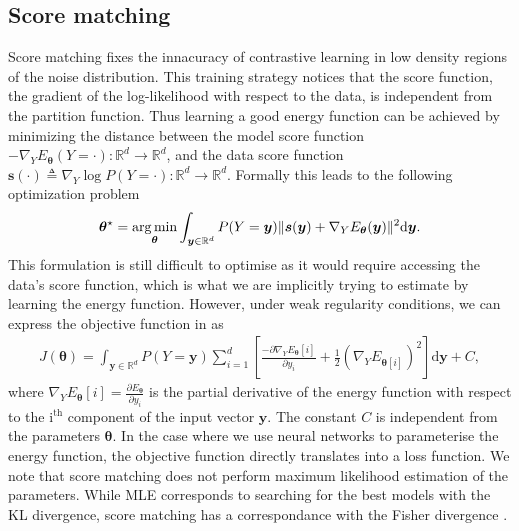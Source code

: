 
\subsection{Score matching}
Score matching \citep{hyvarinen2005estimation} fixes the innacuracy of contrastive learning in low density regions of the noise distribution. This training strategy notices that the score function, the gradient of the log-likelihood with respect to the data, is independent from the partition function. Thus learning a good energy function can be achieved by minimizing the distance between the model score function $-\nabla_Y E_{\bm{\theta}}(Y=\cdot): \mathbb{R}^d \rightarrow \mathbb{R}^d$, and the data score function $\bm{s}(\cdot)\triangleq \nabla_Y \log P(Y=\cdot): \mathbb{R}^d \rightarrow \mathbb{R}^d$. Formally this leads to the following optimization problem
\begin{align}
  \bm{\theta}^{\star} = \operatorname*{arg\,min}_{\bm{\theta}} \int_{\bm{y} \in \mathbb{R}^d} P(Y=\bm{y}) \lVert \bm{s}(\bm{y}) + \nabla_Y E_{\bm{\theta}}(\bm{y})\rVert^2 \text{d}\bm{y}. \label{eq:score_matching}
\end{align}
This formulation is still difficult to optimise as it would require accessing the data's score function, which is what we are implicitly trying to estimate by learning the energy function. However, under weak regularity conditions, we can express the objective function in  as
\begin{align}
  J(\bm{\theta}) = \int_{\bm{y} \in \mathbb{R}^d} P(Y=\bm{y}) \sum_{i=1}^d \left[ \frac{-\partial \nabla_Y E_{\bm{\theta}}[i]}{\partial y_i } + \frac{1}{2} (\nabla_Y E_{\bm{\theta}[i]})^2 \right] \text{d}\bm{y} + C,
\end{align}
where $\nabla_Y E_{\bm{\theta}}[i] = \frac{\partial E_{\bm{\theta}}}{\partial y_i}$ is the partial derivative of the energy function with respect to the $\text{i}^{\text{th}}$ component of the input vector $\bm y$. The constant $C$ is independent from the parameters $\bm \theta$. In the case where we use neural networks to parameterise the energy function, the objective function directly translates into a loss function. We note that score matching does not perform maximum likelihood estimation of the parameters. While MLE corresponds to searching for the best models with the KL divergence, score matching has a correspondance with the Fisher divergence \citep{lyu2012interpretation}.

